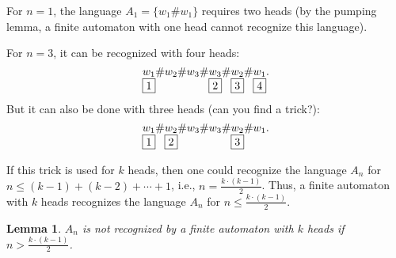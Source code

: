 \documentclass[12pt,sans]{article}
\theoremstyle{definition}
\theoremstyle{plain}
\newtheorem{lemma}{Lemma}[section]
\theoremstyle{remark}
\begin{document}
For $n = 1$, the language $A_1 = \{w_1\#w_1\}$ requires two heads (by the pumping lemma, a finite automaton with one head cannot recognize this language).

For $n = 3$, it can be recognized with four heads:
\[
\underset{\fbox{1}}{w_1}\#w_2\#w_3\#\underset{\fbox{2}}{w_3}\#\underset{\fbox{3}}{w_2}\#\underset{\fbox{4}}{w_1}.
\]
But it can also be done with three heads (can you find a trick?):
\[
\underset{\fbox{1}}{w_1}\#\underset{\fbox{2}}{w_2}\#w_3\#w_3\#\underset{\fbox{3}}{w_2}\#w_1.
\]

If this trick is used for $k$ heads, then one could recognize the language $A_n$ for $n \le (k-1) + (k-2) + \dotsb + 1$, i.e., $n = \frac{k \cdot (k-1)}{2}$. Thus, a finite automaton with $k$ heads recognizes the language $A_n$ for $n \le \frac{k \cdot (k-1)}{2}$.

\begin{lemma}
    $A_n$ is not recognized by a finite automaton with $k$ heads if $n > \frac{k \cdot (k-1)}{2}$.
\end{lemma}
\end{document}
